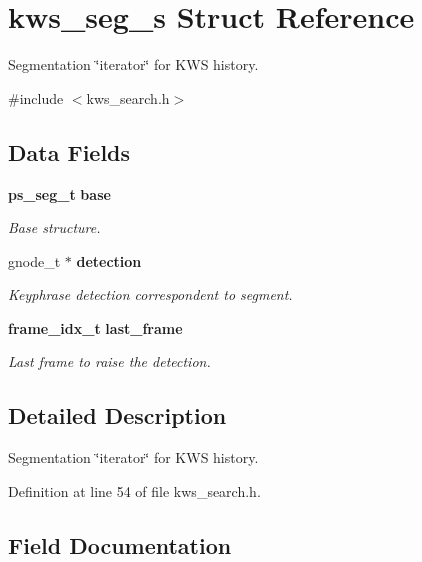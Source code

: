 \section{kws\+\_\+seg\+\_\+s Struct Reference}
\label{structkws__seg__s}


Segmentation \char`\"{}iterator\char`\"{} for K\+WS history.  




{\ttfamily \#include $<$kws\+\_\+search.\+h$>$}

\subsection*{Data Fields}
\begin{DoxyCompactItemize}
\item 
\textbf{ ps\+\_\+seg\+\_\+t} \textbf{ base}
\begin{DoxyCompactList}\small\item\em Base structure. \end{DoxyCompactList}\item 
gnode\+\_\+t $\ast$ \textbf{ detection}
\begin{DoxyCompactList}\small\item\em Keyphrase detection correspondent to segment. \end{DoxyCompactList}\item 
\mbox{\label{structkws__seg__s_a7c7afd51e8b0484936fe23039f111151}} 
\textbf{ frame\+\_\+idx\+\_\+t} \textbf{ last\+\_\+frame}
\begin{DoxyCompactList}\small\item\em Last frame to raise the detection. \end{DoxyCompactList}\end{DoxyCompactItemize}


\subsection{Detailed Description}
Segmentation \char`\"{}iterator\char`\"{} for K\+WS history. 

Definition at line 54 of file kws\+\_\+search.\+h.



\subsection{Field Documentation}
\mbox{\label{structkws__seg__s_ab8b059f475f5e64301195cf9816bde2a}} 
